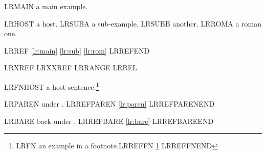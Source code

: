 

\ea\label{lr:main} LRMAIN a main example.
\z

\ea LRHOST a host.
  \ea\label{lr:sub} LRSUBA a sub-example.
  \ex LRSUBB another.
    \ea\label{lr:rom} LRROMA a roman one.
    \z
  \z
\z

LRREF \ref{lr:main} \ref{lr:sub} \ref{lr:rom} LRREFEND

LRXREF  LRXXREF  LRRANGE
 LRREL \Next\ \Last

LRFNHOST a host sentence.\footnote{\ea\label{lr:fn} LRFN an example in a
  footnote.\z LRREFFN \ref{lr:fn} LRREFFNEND}

\ExParenRefs
\ea\label{lr:paren} LRPAREN under \string\ExParenRefs.
\z
LRREFPAREN \ref{lr:paren} LRREFPARENEND

\ExBareRefs
\ea\label{lr:bare} LRBARE back under \string\ExBareRefs.
\z
LRREFBARE \ref{lr:bare} LRREFBAREEND

